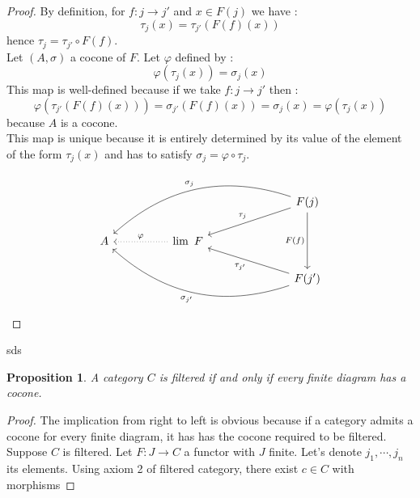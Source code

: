 \documentclass[12pt]{article}
\newtheorem{prop}{Proposition}
\begin{document}
\begin{proof}
By definition, for $f : j \to j'$ and $x \in F(j)$ we have :
$$
\tau_j(x) = \tau_{j'} (F(f)(x))
$$
hence $\tau_j= \tau_{j'} \circ F(f)$.\\
Let $(A, \sigma)$ a cocone of $F$. Let $\varphi$ defined by :
$$
\varphi(\tau_j(x)) = \sigma_j(x)
$$
This map is well-defined because if we take $f:j \to j'$ then :
$$
\varphi(\tau_{j'}(F(f)(x))) = \sigma_{j'} (F(f)(x)) = \sigma_j(x) = \varphi(\tau_j(x))
$$
because $A$ is a cocone.\\
This map is unique because it is entirely determined by its value of the element of the form $\tau_j(x)$ and has to satisfy $\sigma_j = \varphi \circ \tau_j$.

$$
\begin{tikzcd}
  &  &                                         &  &  & F(j) \arrow[dd, "F(f)"'] \arrow[llllld, "\sigma_j"', bend right] \arrow[llld, "\tau_j"'] \\
A &  & \lim \ F \arrow[ll, "\varphi"', dotted] &  &  &                                                                                          \\
  &  &                                         &  &  & F(j') \arrow[lllllu, "\sigma_{j'}", bend left] \arrow[lllu, "\tau_{j'}"]                
\end{tikzcd}
$$

\end{proof}
sds
\begin{prop}
A category $C$ is filtered if and only if every finite diagram has a cocone.
\end{prop}

\begin{proof}
The implication from right to left is obvious because if a category admits a cocone for every finite diagram, it has has the cocone required to be filtered.\\

Suppose $C$ is filtered. Let $F : J \to C$ a functor with $J$ finite. Let's denote $j_1, \cdots, j_n$ its elements. Using axiom 2 of filtered category, there exist $c \in C$ with morphisms 
\end{proof}
\end{document}
